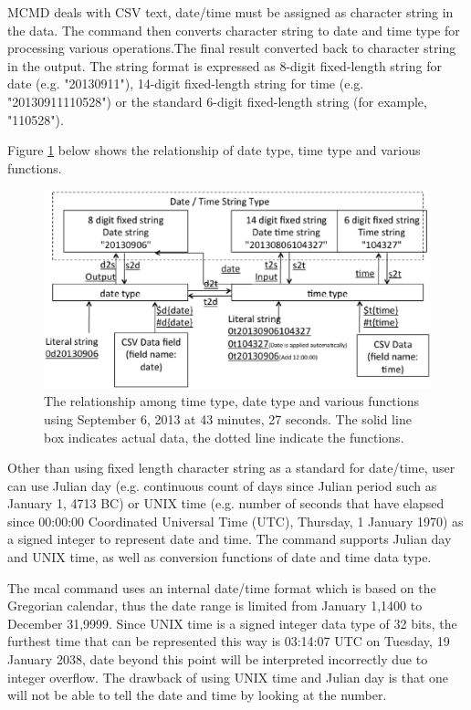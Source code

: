 MCMD deals with CSV text, date/time must be assigned as character string in the data. The command then converts character string to date and time type for processing various operations.The final result converted back to character string in the output. The string format is expressed as 8-digit fixed-length string for date (e.g. "20130911"), 14-digit fixed-length string  for time (e.g. "20130911110528") or the standard 6-digit fixed-length string (for example, "110528").

Figure \ref{fig:mcal_datetime} below shows the relationship of date type, time type and various functions. 


\begin{figure}[t!]
\begin{center}
\includegraphics[scale=.50]{figure/datetime/datetime.eps}
\caption{The relationship among time type, date type and various functions using September 6, 2013 at 43 minutes, 27 seconds. The solid line box indicates actual data, the dotted line indicate the functions. \label{fig:mcal_datetime}}
\end{center}
\end{figure}

Other than using fixed length character string as a standard for date/time, user can use Julian day (e.g. continuous count of days since Julian period such as January 1, 4713 BC) or UNIX time (e.g. number of seconds that have elapsed since 00:00:00 Coordinated Universal Time (UTC), Thursday, 1 January 1970) as a signed integer to represent date and time.  The command supports Julian day and UNIX time, as well as conversion functions of date and time data type.   

The mcal command uses an internal date/time format which is based on the Gregorian calendar, thus the date range is limited from January 1,1400 to December 31,9999. Since UNIX time is a signed integer data type of 32 bits, the  furthest time that can be represented this way is 03:14:07 UTC on Tuesday, 19 January 2038, date beyond this point will be interpreted incorrectly due to integer overflow. The drawback of using UNIX time and Julian day is that one will not be able to tell the date and time by looking at the number. 

%
